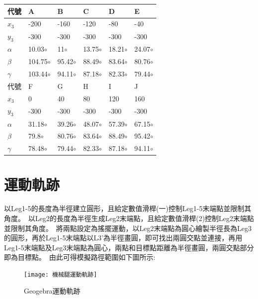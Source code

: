 \begin{table}[htbp]
  \large
  \setlength{\tabcolsep}{0.7cm}
  \begin{tabular}{|p{2cm}|p{2cm}|p{2cm}|p{2cm}|p{2cm}|p{2cm}|}
    \hline
    代號 & A & B & C & D & E \\
    \hline
    $x_3$ & -200 & -160 & -120 & -80 & -40 \\
    \hline
    $y_3$ & -300 & -300 & -300 & -300 & -300 \\
    \hline
    $\alpha$ & 10.03$\circ$ & 11$\circ$ & 13.75$\circ$ & 18.21$\circ$ & 24.07$\circ$  \\
    \hline
    $\beta$ & 104.75$\circ$ & 95.42$\circ$ & 88.49$\circ$ & 83.64$\circ$ & 80.76$\circ$  \\
    \hline
    $\gamma$ & 103.44$\circ$ & 94.11$\circ$ & 87.18$\circ$ & 82.33$\circ$ & 79.44$\circ$  \\
    \hline
    代號 & F & G & H & I & J \\
    \hline
    $x_3$ & 0 & 40 & 80 & 120 & 160 \\
    \hline
    $y_3$ & -300 & -300 & -300 & -300 & -300 \\
    \hline
    $\alpha$ & 31.18$\circ$ & 39.26$\circ$ & 48.07$\circ$ & 57.39$\circ$ & 67.15$\circ$  \\
    \hline
    $\beta$ & 79.8$\circ$ & 80.76$\circ$ & 83.64$\circ$ & 88.49$\circ$ & 95.42$\circ$  \\
    \hline
    $\gamma$ & 78.48$\circ$ & 79.44$\circ$ & 82.33$\circ$ & 87.18$\circ$ & 94.11$\circ$  \\
    \hline
  \end{tabular}
\end{table}

\section{運動軌跡}
以Leg1-5的長度為半徑建立圓形，且給定數值滑桿(一)控制Leg1-5末端點並限制其角度。\
以Leg2的長度為半徑生成Leg2末端點，且給定數值滑桿(2)控制Leg2末端點並限制其角度。\
將兩點設定為搖擺運動，以Leg2末端點為圓心繪製半徑長為Leg3的圓形，再於Leg1-5末端點以L3’為半徑畫圓，即可找出兩圓交點並連接，再用Leg1-5末端點及Leg3末端點為圓心，兩點和目標點距離為半徑畫圓，兩圓交點部分即為目標點。\
由此可得模擬路徑範圍如下圖所示:\\
\begin{figure}[hbt!]
\begin{center}
\texttt{[image: 機械腿運動軌跡]}
\caption{\Large Geogebra運動軌跡}\label{機械腿運動軌跡}
\end{center}
\end{figure}
\newpage
